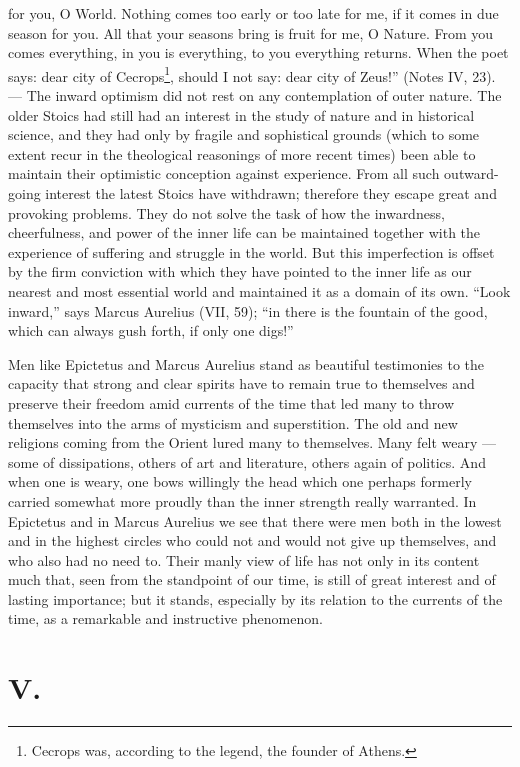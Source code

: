 \documentclass[12pt,a4paper,openany]{book}
\newcommand{\opage}[1]{\marginnote{\footnotesize\textit{[#1]}}}
\begin{document}
for you, O World. Nothing comes too early or too late
for me, if it comes in due season for you. All that your
seasons bring is fruit for me, O Nature. From you comes
everything, in you is everything, to you everything returns. When the poet
says: dear city of Cecrops\footnote{Cecrops was, according to the legend, the founder of Athens.}, should I not say: dear
city of Zeus!'' (Notes IV, 23). --- The inward
optimism did not rest on any contemplation of outer nature.
The older Stoics had still had an interest in the study of nature
and in historical science, and they had only by fragile
and sophistical grounds (which to some extent recur in the theological
reasonings of more recent times) been able to maintain their
optimistic conception against experience. From all such 
\opage{174}outward-going interest the latest Stoics have withdrawn;
therefore they escape great and provoking problems. They
do not solve the task of how the inwardness, cheerfulness,
and power of the inner life can be maintained together with the experience of
suffering and struggle in the world. But this imperfection
is offset by the firm conviction with which they have
pointed to the inner life as our nearest and most essential
world and maintained it as a domain of its own. ``Look
inward,'' says Marcus Aurelius (VII, 59); ``in there is the
fountain of the good, which can always gush forth, if only one digs!''

Men like Epictetus and Marcus Aurelius stand as beautiful
testimonies to the capacity that strong and clear spirits have
to remain true to themselves and preserve their freedom amid
currents of the time that led many to throw themselves into the arms of
mysticism and superstition. The old and
new religions coming from the Orient lured many to themselves. Many felt weary
--- some of dissipations, others of art and literature, others
again of politics. And when one is weary, one bows willingly the
head which one perhaps formerly carried somewhat more proudly than
the inner strength really warranted. %
In Epictetus and in Marcus
Aurelius we see that there were men both in the lowest and in the
highest circles who could not and would not give up
themselves, and who also had no need to. Their manly
view of life has not only in its content much that, seen from
the standpoint of our time, is still of great interest and of lasting
importance; but it stands, especially by its relation to the
currents of the time, as a remarkable and instructive phenomenon.

\section*{V.}
\end{document}
